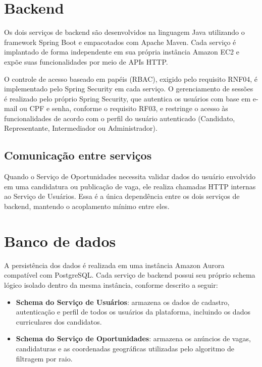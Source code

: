 \documentclass[
    12pt,
    oneside,
    a4paper,
    brazil
]{abntex2}
\begin{document}
\section{Backend}

Os dois serviços de backend são desenvolvidos na linguagem Java utilizando o framework Spring Boot e empacotados com Apache Maven. Cada serviço é implantado de forma independente em sua própria instância Amazon EC2 e expõe suas funcionalidades por meio de APIs HTTP.

O controle de acesso baseado em papéis (RBAC), exigido pelo requisito RNF04, é implementado pelo Spring Security em cada serviço. O gerenciamento de sessões é realizado pelo próprio Spring Security, que autentica os usuários com base em e-mail ou CPF e senha, conforme o requisito RF03, e restringe o acesso às funcionalidades de acordo com o perfil do usuário autenticado (Candidato, Representante, Intermediador ou Administrador).

\subsection{Comunicação entre serviços}

Quando o Serviço de Oportunidades necessita validar dados do usuário envolvido em uma candidatura ou publicação de vaga, ele realiza chamadas HTTP internas ao Serviço de Usuários. Essa é a única dependência entre os dois serviços de backend, mantendo o acoplamento mínimo entre eles.

\section{Banco de dados}

A persistência dos dados é realizada em uma instância Amazon Aurora compatível com PostgreSQL. Cada serviço de backend possui seu próprio schema lógico isolado dentro da mesma instância, conforme descrito a seguir:

\begin{itemize}
    \item \textbf{Schema do Serviço de Usuários}: armazena os dados de cadastro, autenticação e perfil de todos os usuários da plataforma, incluindo os dados curriculares dos candidatos.
    \item \textbf{Schema do Serviço de Oportunidades}: armazena os anúncios de vagas, candidaturas e as coordenadas geográficas utilizadas pelo algoritmo de filtragem por raio.
\end{itemize}
\end{document}
